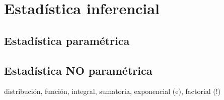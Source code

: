 \documentclass[letterpaper,10pt,openany,oneside]{sphinxmanual}
\begin{document}
\chapter{Estadística inferencial}
\label{Estadistica_Inferencial::doc}\label{Estadistica_Inferencial:estadistica-inferencial}

\section{Estadística paramétrica}
\label{Estadistica_Inferencial:estadistica-parametrica}

\section{Estadística NO paramétrica}
\label{Estadistica_Inferencial:estadistica-no-parametrica}\begin{description}
\item[{distribución, función, integral, sumatoria, exponencial (e), factorial (!)}] \leavevmode{}\label{Glosario:term-distribucion}
\end{description}



\renewcommand{\indexname}{Índice}
\printindex
\end{document}
